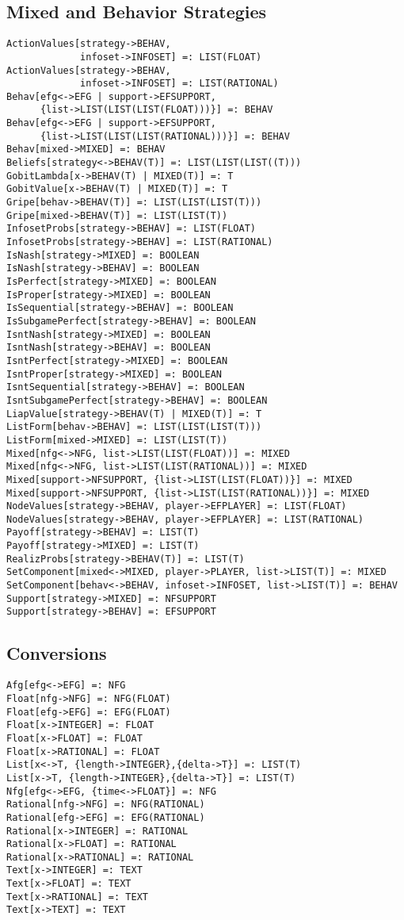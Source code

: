 \subsection{Mixed and Behavior Strategies}

\begin{verbatim}
ActionValues[strategy->BEHAV, 
             infoset->INFOSET] =: LIST(FLOAT)
ActionValues[strategy->BEHAV, 
             infoset->INFOSET] =: LIST(RATIONAL)
Behav[efg<->EFG | support->EFSUPPORT, 
      {list->LIST(LIST(LIST(FLOAT)))}] =: BEHAV
Behav[efg<->EFG | support->EFSUPPORT, 
      {list->LIST(LIST(LIST(RATIONAL)))}] =: BEHAV
Behav[mixed->MIXED] =: BEHAV
Beliefs[strategy<->BEHAV(T)] =: LIST(LIST(LIST((T)))
GobitLambda[x->BEHAV(T) | MIXED(T)] =: T
GobitValue[x->BEHAV(T) | MIXED(T)] =: T
Gripe[behav->BEHAV(T)] =: LIST(LIST(LIST(T)))
Gripe[mixed->BEHAV(T)] =: LIST(LIST(T))
InfosetProbs[strategy->BEHAV] =: LIST(FLOAT)
InfosetProbs[strategy->BEHAV] =: LIST(RATIONAL)
IsNash[strategy->MIXED] =: BOOLEAN
IsNash[strategy->BEHAV] =: BOOLEAN
IsPerfect[strategy->MIXED] =: BOOLEAN
IsProper[strategy->MIXED] =: BOOLEAN
IsSequential[strategy->BEHAV] =: BOOLEAN
IsSubgamePerfect[strategy->BEHAV] =: BOOLEAN
IsntNash[strategy->MIXED] =: BOOLEAN
IsntNash[strategy->BEHAV] =: BOOLEAN
IsntPerfect[strategy->MIXED] =: BOOLEAN
IsntProper[strategy->MIXED] =: BOOLEAN
IsntSequential[strategy->BEHAV] =: BOOLEAN
IsntSubgamePerfect[strategy->BEHAV] =: BOOLEAN
LiapValue[strategy->BEHAV(T) | MIXED(T)] =: T
ListForm[behav->BEHAV] =: LIST(LIST(LIST(T)))
ListForm[mixed->MIXED] =: LIST(LIST(T))
Mixed[nfg<->NFG, list->LIST(LIST(FLOAT))] =: MIXED
Mixed[nfg<->NFG, list->LIST(LIST(RATIONAL))] =: MIXED
Mixed[support->NFSUPPORT, {list->LIST(LIST(FLOAT))}] =: MIXED
Mixed[support->NFSUPPORT, {list->LIST(LIST(RATIONAL))}] =: MIXED
NodeValues[strategy->BEHAV, player->EFPLAYER] =: LIST(FLOAT)
NodeValues[strategy->BEHAV, player->EFPLAYER] =: LIST(RATIONAL)
Payoff[strategy->BEHAV] =: LIST(T)
Payoff[strategy->MIXED] =: LIST(T)
RealizProbs[strategy->BEHAV(T)] =: LIST(T)
SetComponent[mixed<->MIXED, player->PLAYER, list->LIST(T)] =: MIXED 
SetComponent[behav<->BEHAV, infoset->INFOSET, list->LIST(T)] =: BEHAV 
Support[strategy->MIXED] =: NFSUPPORT
Support[strategy->BEHAV] =: EFSUPPORT
\end{verbatim}

\subsection{Conversions}

\begin{verbatim}
Afg[efg<->EFG] =: NFG
Float[nfg->NFG] =: NFG(FLOAT)
Float[efg->EFG] =: EFG(FLOAT)
Float[x->INTEGER] =: FLOAT
Float[x->FLOAT] =: FLOAT
Float[x->RATIONAL] =: FLOAT
List[x<->T, {length->INTEGER},{delta->T}] =: LIST(T)
List[x->T, {length->INTEGER},{delta->T}] =: LIST(T)
Nfg[efg<->EFG, {time<->FLOAT}] =: NFG
Rational[nfg->NFG] =: NFG(RATIONAL)
Rational[efg->EFG] =: EFG(RATIONAL)
Rational[x->INTEGER] =: RATIONAL
Rational[x->FLOAT] =: RATIONAL
Rational[x->RATIONAL] =: RATIONAL
Text[x->INTEGER] =: TEXT
Text[x->FLOAT] =: TEXT
Text[x->RATIONAL] =: TEXT
Text[x->TEXT] =: TEXT
\end{verbatim}

